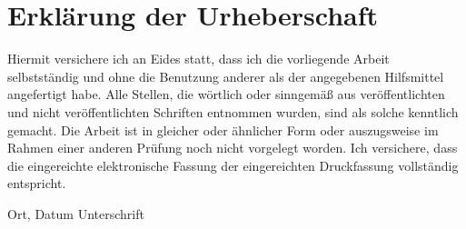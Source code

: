 \documentclass[11pt,a4paper,toc=bibliography]{scrartcl}
\theoremstyle{def}
\theoremstyle{thm}
\theoremstyle{remark}
\begin{document}
\setlength{\parskip}{1pt}
\renewcommand{\nomname}{}
\printnomenclature[4cm]
\newpage



\newpage
\pagestyle{plain}
\section*{Erklärung der Urheberschaft}
Hiermit versichere ich an Eides  statt, dass ich die vorliegende Arbeit selbstständig und  ohne die Benutzung anderer als der angegebenen Hilfsmittel angefertigt habe. Alle Stellen, die wörtlich oder sinngemäß aus veröffentlichten und nicht veröffentlichten Schriften entnommen wurden, sind als solche kenntlich gemacht. Die Arbeit ist in gleicher oder ähnlicher Form oder auszugsweise im Rahmen einer anderen Prüfung noch  nicht vorgelegt worden. Ich versichere, dass die eingereichte elektronische Fassung der eingereichten Druckfassung vollständig entspricht.

\vspace{4cm}

\hspace{2cm} Ort, Datum \hfill Unterschrift \hspace{2cm}
\end{document}
